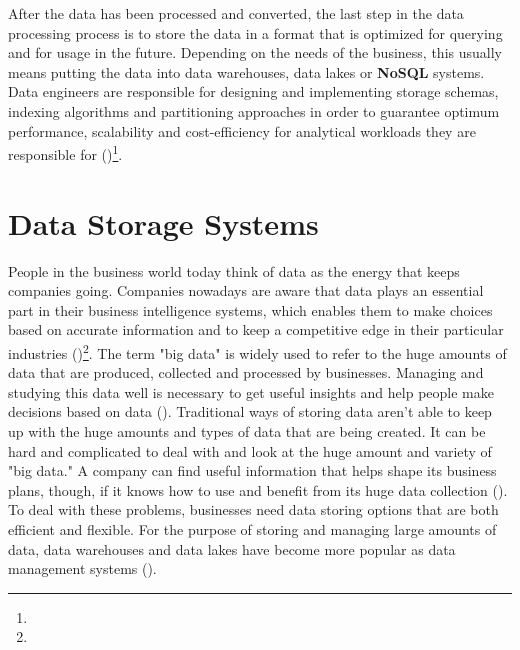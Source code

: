 After the data has been processed and converted, the last step in the data processing process is to store the data in a format that is optimized for querying and for usage in the future. Depending on the needs of the business, this usually means putting the data into data warehouses, data lakes or \textbf{NoSQL} systems. Data engineers are responsible for designing and implementing storage schemas, indexing algorithms and partitioning approaches in order to guarantee optimum performance, scalability and cost-efficiency for analytical workloads they are responsible for (\cite{tomeDataEngineeringScala2024})\footnote[10]{}.

\section{Data Storage Systems}

People in the business world today think of data as the energy that keeps companies going. Companies nowadays are aware that data plays an essential part in their business intelligence systems, which enables them to make choices based on accurate information and to keep a competitive edge in their particular industries (\cite{Nambiar2022AnOO})\footnote[20]{}. The term "big data" is widely used to refer to the huge amounts of data that are produced, collected and processed by businesses. Managing and studying this data well is necessary to get useful insights and help people make decisions based on data (\cite{Nambiar2022AnOO})\footnotemark[20]. Traditional ways of storing data aren't able to keep up with the huge amounts and types of data that are being created. It can be hard and complicated to deal with and look at the huge amount and variety of "big data." A company can find useful information that helps shape its business plans, though, if it knows how to use and benefit from its huge data collection (\cite{Nambiar2022AnOO})\footnotemark[20]. To deal with these problems, businesses need data storing options that are both efficient and flexible. For the purpose of storing and managing large amounts of data, data warehouses and data lakes have become more popular as data management systems (\cite{Nambiar2022AnOO})\footnotemark[20].


